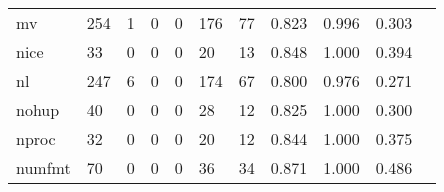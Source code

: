 \begin{longtable}{lp{1.2cm}p{1.2cm}p{1.2cm}p{1.2cm}p{1.2cm}p{1.2cm}p{1.2cm}p{1.2cm}p{1.2cm}p{1.2cm}}
mv        &                                   254 &                                                  1 &                                                  0 &                                                  0 &                                                176 &                                                 77 &                                              0.823 &                                              0.996 &                                              0.303 \\
nice      &                                    33 &                                                  0 &                                                  0 &                                                  0 &                                                 20 &                                                 13 &                                              0.848 &                                              1.000 &                                              0.394 \\
nl        &                                   247 &                                                  6 &                                                  0 &                                                  0 &                                                174 &                                                 67 &                                              0.800 &                                              0.976 &                                              0.271 \\
nohup     &                                    40 &                                                  0 &                                                  0 &                                                  0 &                                                 28 &                                                 12 &                                              0.825 &                                              1.000 &                                              0.300 \\
nproc     &                                    32 &                                                  0 &                                                  0 &                                                  0 &                                                 20 &                                                 12 &                                              0.844 &                                              1.000 &                                              0.375 \\
numfmt    &                                    70 &                                                  0 &                                                  0 &                                                  0 &                                                 36 &                                                 34 &                                              0.871 &                                              1.000 &                                              0.486 \\

\end{longtable}
